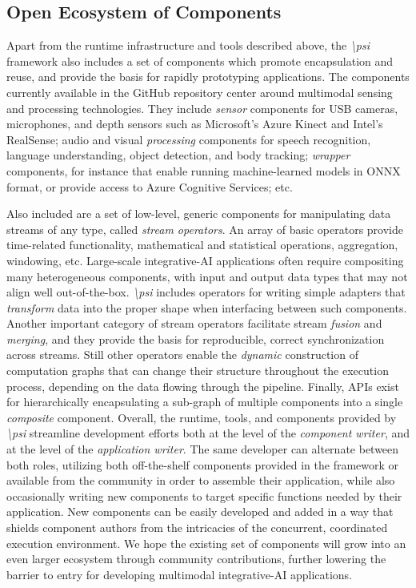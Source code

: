 \documentclass[letterpaper]{article}
\newcommand{\psif}{\emph{\textbackslash psi} }
\begin{document}
\subsection{Open Ecosystem of Components}

Apart from the runtime infrastructure and tools described above, the \psif framework also includes a set of components which promote encapsulation and reuse, and provide the basis for rapidly prototyping applications. The components currently available in the GitHub repository center around multimodal sensing and processing technologies. They include \emph{sensor} components for USB cameras, microphones, and depth sensors such as Microsoft's Azure Kinect and Intel's RealSense; audio and visual \emph{processing} components for speech recognition, language understanding, object detection, and body tracking; \emph{wrapper} components, for instance that enable running machine-learned models in ONNX format, or provide access to Azure Cognitive Services; etc.

Also included are a set of low-level, generic components for manipulating data streams of any type, called \emph{stream operators}. An array of basic operators provide time-related functionality, mathematical and statistical operations, aggregation, windowing, etc. Large-scale integrative-AI applications often require compositing many heterogeneous components, with input and output data types that may not align well out-of-the-box. \psif includes operators for writing simple adapters that \emph{transform} data into the proper shape when interfacing between such components. Another important category of stream operators facilitate stream \emph{fusion} and \emph{merging}, and they provide the basis for reproducible, correct synchronization across streams. Still other operators enable the \emph{dynamic} construction of computation graphs that can change their structure throughout the execution process, depending on the data flowing through the pipeline. Finally, APIs exist for hierarchically encapsulating a sub-graph of multiple components into a single \emph{composite} component.  Overall, the runtime, tools, and components provided by \psif streamline development efforts both at the level of the \emph{component writer}, and at the level of the \emph{application writer}. The same developer can alternate between both roles, utilizing both off-the-shelf components provided in the framework or available from the community in order to assemble their application, while also occasionally writing new components to target specific functions needed by their application. New components can be easily developed and added in a way that shields component authors from the intricacies of the concurrent, coordinated execution environment. We hope the existing set of components will grow into an even larger ecosystem through community contributions, further lowering the barrier to entry for developing multimodal integrative-AI applications.
\end{document}
